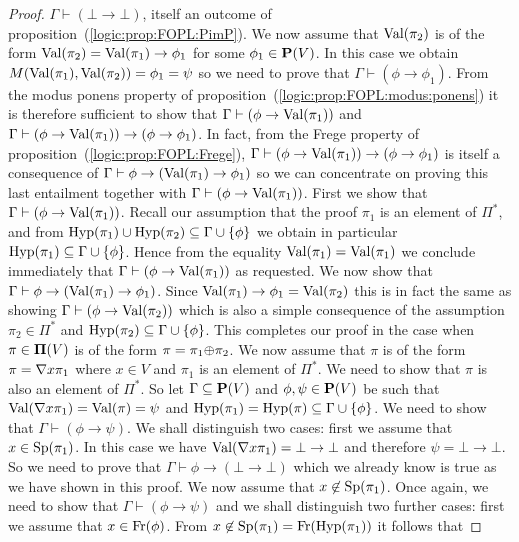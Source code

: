 \begin{proof}
$\Gamma\vdash(\bot\to\bot)$, itself an outcome of
proposition~(\ref{logic:prop:FOPL:PimP}). We now assume that
$\mbox{\rm Val}(\pi_{2})$ is of the form
$\mbox{\rm Val}(\pi_{2})=\mbox{\rm Val}(\pi_{1})\to\phi_{1}$ for some $\phi_{1}\in\mbox{${\bf P}(V)$}$.
In this case we obtain $M(\mbox{\rm Val}(\pi_{1}),\mbox{\rm Val}(\pi_{2})) =
\phi_{1}=\psi$ so we need to prove that
$\Gamma\vdash(\phi\to\phi_{1})$. From the modus ponens property of
proposition~(\ref{logic:prop:FOPL:modus:ponens}) it is therefore
sufficient to show that $\Gamma\vdash(\phi\to\mbox{\rm Val}(\pi_{1}))$ and
$\Gamma\vdash(\phi\to\mbox{\rm Val}(\pi_{1}))\to(\phi\to\phi_{1})$. In fact,
from the Frege property of
proposition~(\ref{logic:prop:FOPL:Frege}),
$\Gamma\vdash(\phi\to\mbox{\rm Val}(\pi_{1}))\to(\phi\to\phi_{1})$ is itself a
consequence of $\Gamma\vdash\phi\to(\mbox{\rm Val}(\pi_{1})\to\phi_{1})$ so we
can concentrate on proving this last entailment together with
$\Gamma\vdash(\phi\to\mbox{\rm Val}(\pi_{1}))$. First we show that
$\Gamma\vdash(\phi\to\mbox{\rm Val}(\pi_{1}))$. Recall our assumption that the
proof $\pi_{1}$ is an element of $\Pi^{*}$, and from
$\mbox{\rm Hyp}(\pi_{1})\cup\mbox{\rm Hyp}(\pi_{2})\subseteq\Gamma\cup\{\phi\}$ we
obtain in particular $\mbox{\rm Hyp}(\pi_{1})\subseteq\Gamma\cup\{\phi\}$.
Hence from the equality $\mbox{\rm Val}(\pi_{1})=\mbox{\rm Val}(\pi_{1})$ we conclude
immediately that $\Gamma\vdash(\phi\to\mbox{\rm Val}(\pi_{1}))$ as requested.
We now show that $\Gamma\vdash\phi\to(\mbox{\rm Val}(\pi_{1})\to\phi_{1})$.
Since $\mbox{\rm Val}(\pi_{1})\to\phi_{1}=\mbox{\rm Val}(\pi_{2})$ this is in fact the
same as showing $\Gamma\vdash(\phi\to\mbox{\rm Val}(\pi_{2}))$ which is also a
simple consequence of the assumption $\pi_{2}\in\Pi^{*}$ and
$\mbox{\rm Hyp}(\pi_{2})\subseteq\Gamma\cup\{\phi\}$. This completes our proof
in the case when $\pi\in\mbox{${\bf\Pi}(V)$}$ is of the form
$\pi=\pi_{1}\mbox{$\oplus$}\pi_{2}$. We now assume that $\pi$ is of the form
$\pi=\mbox{$\nabla$} x\pi_{1}$ where $x\in V$ and $\pi_{1}$ is an element of
$\Pi^{*}$. We need to show that $\pi$ is also an element of
$\Pi^{*}$. So let $\Gamma\subseteq\mbox{${\bf P}(V)$}$ and $\phi,\psi\in\mbox{${\bf P}(V)$}$ be such
that $\mbox{\rm Val}(\mbox{$\nabla$} x\pi_{1})=\mbox{\rm Val}(\pi)=\psi$ and
$\mbox{\rm Hyp}(\pi_{1})=\mbox{\rm Hyp}(\pi)\subseteq\Gamma\cup\{\phi\}$. We need to
show that $\Gamma\vdash(\phi\to\psi)$. We shall distinguish two
cases: first we assume that $x\in\mbox{\rm Sp}(\pi_{1})$. In this case we
have $\mbox{\rm Val}(\mbox{$\nabla$} x\pi_{1})=\bot\to\bot$ and therefore
$\psi=\bot\to\bot$. So we need to prove that
$\Gamma\vdash\phi\to(\bot\to\bot)$ which we already know is true as
we have shown in this proof. We now assume that
$x\not\in\mbox{\rm Sp}(\pi_{1})$. Once again, we need to show that
$\Gamma\vdash(\phi\to\psi)$ and we shall distinguish two further
cases: first we assume that $x\in\mbox{\rm Fr}(\phi)$. From
$x\not\in\mbox{\rm Sp}(\pi_{1})=\mbox{\rm Fr}(\mbox{\rm Hyp}(\pi_{1}))$ it follows that

\end{proof}
